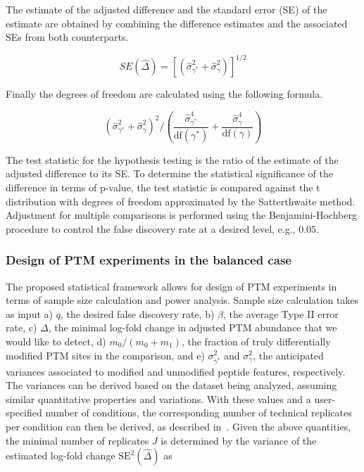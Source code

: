 \documentclass[mcp]{article}
\numberwithin{table}{section}
\begin{document}
The estimate of the adjusted difference and the standard error (SE) of the estimate are obtained by combining the difference estimates and the associated SEs from both counterparts.

\begin{equation}
SE(\hat{\Delta}) = \left[ \left( \hat{\sigma}_{\gamma^{\ast}}^{2} + \hat{\sigma}_{\gamma}^{2} \right) \right]^{1/2}
\end{equation}

Finally the degrees of freedom are calculated using the following formula.

\begin{equation}
\left( \hat{\sigma}_{\gamma^{\ast}}^{2} + \hat{\sigma}_{\gamma}^{2} \right)^2 \bigg/
\left( \frac{\hat{\sigma}_{\gamma^{\ast}}^{4}}{\mathrm{df}(\gamma^{\ast})} + \frac{\hat{\sigma}_{\gamma}^{4}}{ \mathrm{df}(\gamma)} \right)
\end{equation}

The test statistic for the hypothesis testing is the ratio of the estimate of the adjusted difference to its SE. To determine the statistical significance of the difference in terms of p-value, the test statistic is compared against the t distribution with degrees of freedom approximated by the Satterthwaite method\cite{satterthwaite:1946}. Adjustment for multiple comparisons is performed using the Benjamini-Hochberg procedure to control the false discovery rate at a desired level, e.g., $0.05$\cite{Benjamini:1995}.

\subsubsection*{Design of PTM experiments in the balanced case}
\label{sec:design}

The proposed statistical framework allows for design of PTM experiments in terms of sample size calculation and power analysis. 
Sample size calculation takes as input a) $q$, the desired false discovery rate, b) $\beta$, the average Type II error rate, c) $\Delta$, the minimal log-fold change in adjusted PTM abundance that we would like to detect, d) $m_0 / (m_0 + m_1)$, the fraction of truly differentially modified PTM sites in the comparison, and e) $\sigma_{\gamma^{\ast}}^{2}$ and $\sigma_{\gamma}^{2}$, the anticipated variances associated to modified and unmodified peptide features, respectively. The variances can be derived based on the dataset being analyzed, assuming similar quantitative properties and variations. With these values and a user-specified number of conditions, the corresponding number of technical replicates per condition can then be derived, as described in~\cite{kutner_etal_04a}. Given the above quantities, the minimal number of replicates $J$ is determined by the variance of the estimated log-fold change $\mathrm{SE}^{2}(\hat{\Delta})$ as
\end{document}
